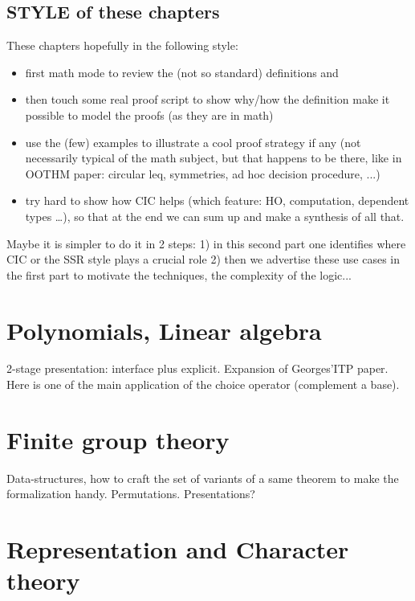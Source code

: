 \documentclass{book}
\begin{document}
\section*{STYLE of these chapters}
These chapters hopefully in the following style:
\begin{itemize}
\item first math mode to review the (not so standard) definitions and
\item then touch some real proof script to show why/how the definition
  make it possible to model the proofs (as they are in math)
\item use the (few) examples to illustrate a cool proof strategy if
  any (not necessarily typical of the math subject, but that happens to
  be there, like in OOTHM paper: circular leq, symmetries, ad hoc
  decision procedure, ...)
\item try hard to show how CIC helps (which feature: HO, computation, dependent
	types \ldots), so that at the end we can sum up and make a synthesis of
	all that.
\end{itemize}

Maybe it is simpler to do it in 2 steps:
1) in this second part one identifies where CIC or the SSR style plays a
   crucial role
2) then we advertise these use cases in the first part to motivate
   the techniques, the complexity of the logic...



\chapter{Polynomials, Linear algebra}

2-stage presentation: interface plus explicit. Expansion of
Georges'ITP paper. Here is one of the main application of the choice
operator (complement a base).


\chapter{Finite group theory}

Data-structures, how to craft the set of variants of a same theorem to
make the formalization handy. Permutations. Presentations?

\chapter{Representation and Character theory}
\end{document}
